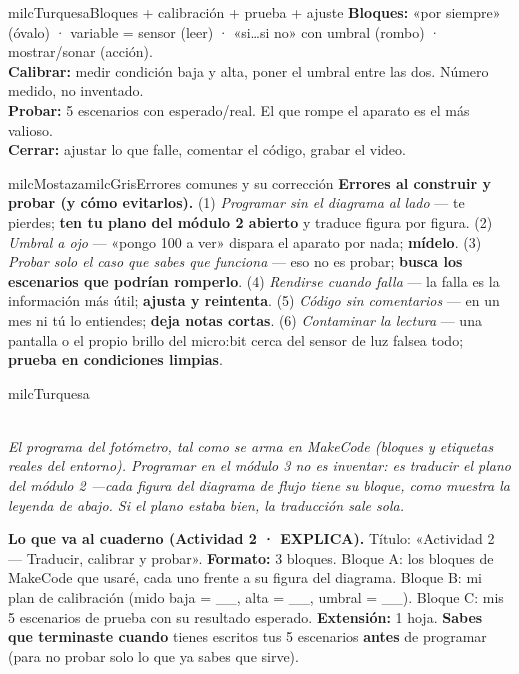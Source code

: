 \documentclass[11pt,letterpaper]{article}
\newcommand{\guiaDiagrama}[2]{%
\begin{center}
\\[1.5mm]
{\footnotesize\itshape\textcolor{milcNegro!75}{#2}}
\end{center}
}
\begin{document}
\begin{drawbox}{milcTurquesa}{Bloques + calibración + prueba + ajuste}
\textbf{Bloques:} «por siempre» (óvalo) · variable = sensor (leer) · «si\ldots si no» con umbral (rombo) · mostrar/sonar (acción). \\[1mm]
\textbf{Calibrar:} medir condición baja y alta, poner el umbral entre las dos. Número medido, no inventado. \\[1mm]
\textbf{Probar:} 5 escenarios con esperado/real. El que rompe el aparato es el más valioso. \\[1mm]
\textbf{Cerrar:} ajustar lo que falle, comentar el código, grabar el video.
\end{drawbox}

\begin{softbox}{milcMostaza}{milcGris}{Errores comunes y su corrección}
\textbf{Errores al construir y probar (y cómo evitarlos).} (1) \emph{Programar sin el diagrama al lado} --- te pierdes; \textbf{ten tu plano del módulo 2 abierto} y traduce figura por figura. (2) \emph{Umbral a ojo} --- «pongo 100 a ver» dispara el aparato por nada; \textbf{mídelo}. (3) \emph{Probar solo el caso que sabes que funciona} --- eso no es probar; \textbf{busca los escenarios que podrían romperlo}. (4) \emph{Rendirse cuando falla} --- la falla es la información más útil; \textbf{ajusta y reintenta}. (5) \emph{Código sin comentarios} --- en un mes ni tú lo entiendes; \textbf{deja notas cortas}. (6) \emph{Contaminar la lectura} --- una pantalla o el propio brillo del micro:bit cerca del sensor de luz falsea todo; \textbf{prueba en condiciones limpias}.
\end{softbox}

\begin{infoband}{milcTurquesa}
\guiaDiagrama{assets/robotica-3/flujo-a-bloques.tex}{El programa del fotómetro, tal como se arma en MakeCode (bloques y etiquetas reales del entorno). Programar en el módulo 3 no es inventar: es traducir el plano del módulo 2 —cada figura del diagrama de flujo tiene su bloque, como muestra la leyenda de abajo. Si el plano estaba bien, la traducción sale sola.}

\textbf{Lo que va al cuaderno (Actividad 2 · EXPLICA).} Título: «Actividad 2 --- Traducir, calibrar y probar». \textbf{Formato:} 3 bloques. Bloque A: los bloques de MakeCode que usaré, cada uno frente a su figura del diagrama. Bloque B: mi plan de calibración (mido baja = \_\_, alta = \_\_, umbral = \_\_). Bloque C: mis 5 escenarios de prueba con su resultado esperado. \textbf{Extensión:} 1 hoja. \textbf{Sabes que terminaste cuando} tienes escritos tus 5 escenarios \textbf{antes} de programar (para no probar solo lo que ya sabes que sirve).
\end{infoband}
\end{document}
